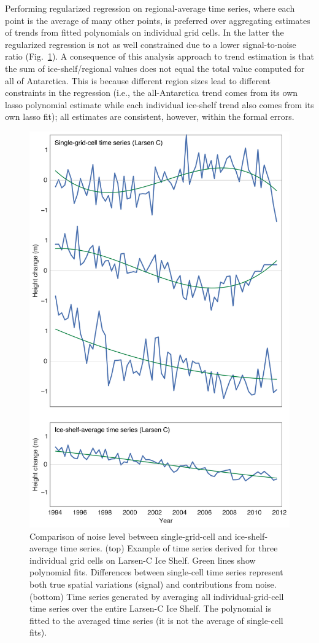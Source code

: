 Performing regularized regression on regional-average time series, where each point is the average of many other points, is preferred over aggregating estimates of trends from fitted polynomials on individual grid cells. In the latter the regularized regression is not as well constrained due to a lower signal-to-noise ratio (Fig.~\ref{c2f8}). A consequence of this analysis approach to trend estimation is that the sum of ice-shelf/regional values does not equal the total value computed for all of Antarctica. This is because different region sizes lead to different constraints in the regression (i.e., the all-Antarctica trend comes from its own lasso polynomial estimate while each individual ice-shelf trend also comes from its own lasso fit); all estimates are consistent, however, within the formal errors.


\begin{figure}[!ht]
  \centering
  \vspace{.5cm}
  \includegraphics[width=.73\textwidth]{img/map_noisy_series_v3.png}
  \caption[Comparison of noise level between single-grid-cell]{
  \ssp \footnotesize
  Comparison of noise level between single-grid-cell and ice-shelf-average time series. (top) Example of time series derived for three individual grid cells on Larsen-C Ice Shelf. Green lines show polynomial fits. Differences between single-cell time series represent both true spatial variations (signal) and contributions from noise. (bottom) Time series generated by averaging all individual-grid-cell time series over the entire Larsen-C Ice Shelf. The polynomial is fitted to the averaged time series (it is not the average of single-cell fits).
  } 
  \label{c2f8}
\end{figure}


